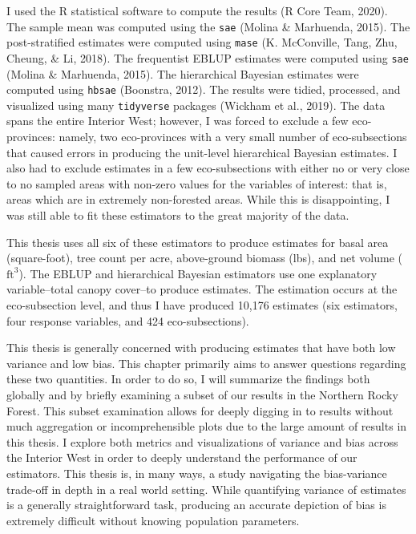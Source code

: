\documentclass[12pt,twoside]{reedthesis}
\begin{document}
I used the R statistical software to compute the results (R Core Team, 2020). The sample mean was computed using the \texttt{sae} (Molina \& Marhuenda, 2015). The post-stratified estimates were computed using \texttt{mase} (K. McConville, Tang, Zhu, Cheung, \& Li, 2018). The frequentist EBLUP estimates were computed using \texttt{sae} (Molina \& Marhuenda, 2015). The hierarchical Bayesian estimates were computed using \texttt{hbsae} (Boonstra, 2012). The results were tidied, processed, and visualized using many \texttt{tidyverse} packages (Wickham et al., 2019). The data spans the entire Interior West; however, I was forced to exclude a few eco-provinces: namely, two eco-provinces with a very small number of eco-subsections that caused errors in producing the unit-level hierarchical Bayesian estimates. I also had to exclude estimates in a few eco-subsections with either no or very close to no sampled areas with non-zero values for the variables of interest: that is, areas which are in extremely non-forested areas. While this is disappointing, I was still able to fit these estimators to the great majority of the data.

This thesis uses all six of these estimators to produce estimates for basal area (square-foot), tree count per acre, above-ground biomass (lbs), and net volume (\(\text{ft}^3\)). The EBLUP and hierarchical Bayesian estimators use one explanatory variable--total canopy cover--to produce estimates. The estimation occurs at the eco-subsection level, and thus I have produced 10,176 estimates (six estimators, four response variables, and 424 eco-subsections).

This thesis is generally concerned with producing estimates that have both low variance and low bias. This chapter primarily aims to answer questions regarding these two quantities. In order to do so, I will summarize the findings both globally and by briefly examining a subset of our results in the Northern Rocky Forest. This subset examination allows for deeply digging in to results without much aggregation or incomprehensible plots due to the large amount of results in this thesis. I explore both metrics and visualizations of variance and bias across the Interior West in order to deeply understand the performance of our estimators. This thesis is, in many ways, a study navigating the bias-variance trade-off in depth in a real world setting. While quantifying variance of estimates is a generally straightforward task, producing an accurate depiction of bias is extremely difficult without knowing population parameters.
\end{document}
